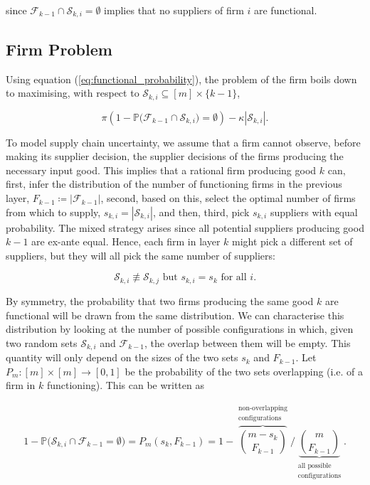 \documentclass[draft, american, abstract=on]{scrartcl}
\theoremstyle{plain}
\renewcommand{\P}{\mathbb{P}}
\newcommand{\abs}[1]{\left\lvert#1\right\rvert}
\begin{document}
since $\mathcal{F}_{k - 1} \cap \mathcal{S}_{k, i} = \emptyset$ implies that no suppliers of firm $i$ are functional.

\subsection{Firm Problem}

Using equation (\ref{eq:functional_probability}), the problem of the firm boils down to maximising, with respect to $\mathcal{S}_{k, i} \subseteq [m] \times \{k-1\}$,

\begin{equation}
  \pi \left(1 - \P\big( \mathcal{F}_{k - 1} \cap \mathcal{S}_{k, i}\big) = \emptyset \right) - \kappa \abs{\mathcal{S}_{k, i} }.
\end{equation}


To model supply chain uncertainty, we assume that a firm cannot observe, before making its supplier decision, the supplier decisions of the firms producing the necessary input good. This implies that a rational firm producing good $k$ can, first, infer the distribution of the number of functioning firms in the previous layer, $F_{k - 1} \coloneqq \abs{\mathcal{F}_{k - 1}}$, second, based on this, select the optimal number of firms from which to supply, $s_{k, i} = \abs{\mathcal{S}_{k, i}}$, and then, third, pick $s_{k, i}$ suppliers with equal probability. The mixed strategy arises since all potential suppliers producing good $k - 1$ are ex-ante equal. Hence, each firm in layer $k$ might pick a different set of suppliers, but they will all pick the same number of suppliers:

\begin{equation}
  \mathcal{S}_{k, i} \not\equiv \mathcal{S}_{k, j} \text{ but } s_{k, i} = s_k \text{ for all } i.
\end{equation}

By symmetry, the probability that two firms producing the same good $k$ are functional will be drawn from the same distribution. We can characterise this distribution by looking at the number of possible configurations in which, given two random sets $\mathcal{S}_{k, i}$ and $\mathcal{F}_{k - 1}$, the overlap between them will be empty. This quantity will only depend on the sizes of the two sets $s_k$ and $F_{k-1}$. Let $P_m: [m]\times[m]\to[0, 1]$ be the probability of the two sets overlapping (i.e. of a firm in $k$ functioning). This can be written as 

\begin{equation}
  1 - \P\big( \mathcal{S}_{k, i} \cap \mathcal{F}_{k - 1} = \emptyset \big) = P_m(s_k, F_{k-1}) =  1 - \overbrace{\binom{m - s_k}{F_{k-1}}}^{\substack{\text{non-overlapping} \\ \text{configurations}}} \Bigg/ \underbrace{\binom{m}{F_{k-1}}}_{\substack{\text{all possible} \\ \text{configurations}}}. 
\end{equation}
\end{document}
